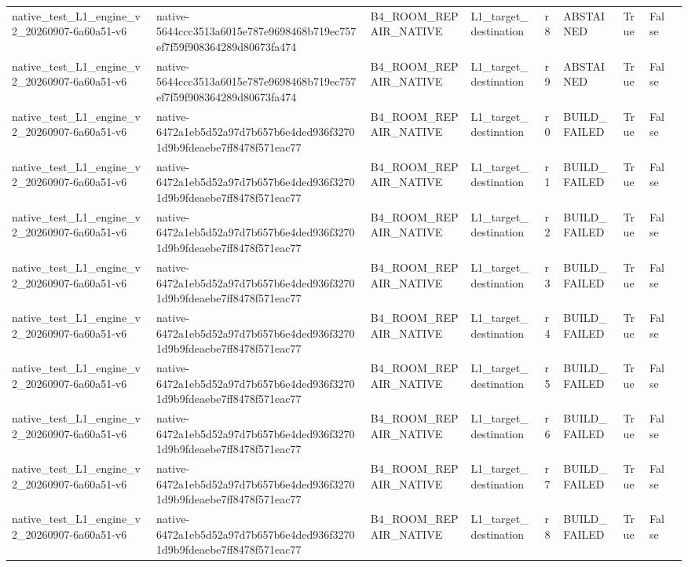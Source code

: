 \begin{tabular}{lllllllll}
native\_test\_L1\_engine\_v2\_20260907-6a60a51-v6 & native-5644ccc3513a6015e787e9698468b719ec757ef7f59f908364289d80673fa474 & B4\_ROOM\_REPAIR\_NATIVE & L1\_target\_destination & r8 & ABSTAINED & True & False &  \\
native\_test\_L1\_engine\_v2\_20260907-6a60a51-v6 & native-5644ccc3513a6015e787e9698468b719ec757ef7f59f908364289d80673fa474 & B4\_ROOM\_REPAIR\_NATIVE & L1\_target\_destination & r9 & ABSTAINED & True & False &  \\
native\_test\_L1\_engine\_v2\_20260907-6a60a51-v6 & native-6472a1eb5d52a97d7b657b6e4ded936f32701d9b9fdeaebe7ff8478f571eac77 & B4\_ROOM\_REPAIR\_NATIVE & L1\_target\_destination & r0 & BUILD\_FAILED & True & False &  \\
native\_test\_L1\_engine\_v2\_20260907-6a60a51-v6 & native-6472a1eb5d52a97d7b657b6e4ded936f32701d9b9fdeaebe7ff8478f571eac77 & B4\_ROOM\_REPAIR\_NATIVE & L1\_target\_destination & r1 & BUILD\_FAILED & True & False &  \\
native\_test\_L1\_engine\_v2\_20260907-6a60a51-v6 & native-6472a1eb5d52a97d7b657b6e4ded936f32701d9b9fdeaebe7ff8478f571eac77 & B4\_ROOM\_REPAIR\_NATIVE & L1\_target\_destination & r2 & BUILD\_FAILED & True & False &  \\
native\_test\_L1\_engine\_v2\_20260907-6a60a51-v6 & native-6472a1eb5d52a97d7b657b6e4ded936f32701d9b9fdeaebe7ff8478f571eac77 & B4\_ROOM\_REPAIR\_NATIVE & L1\_target\_destination & r3 & BUILD\_FAILED & True & False &  \\
native\_test\_L1\_engine\_v2\_20260907-6a60a51-v6 & native-6472a1eb5d52a97d7b657b6e4ded936f32701d9b9fdeaebe7ff8478f571eac77 & B4\_ROOM\_REPAIR\_NATIVE & L1\_target\_destination & r4 & BUILD\_FAILED & True & False &  \\
native\_test\_L1\_engine\_v2\_20260907-6a60a51-v6 & native-6472a1eb5d52a97d7b657b6e4ded936f32701d9b9fdeaebe7ff8478f571eac77 & B4\_ROOM\_REPAIR\_NATIVE & L1\_target\_destination & r5 & BUILD\_FAILED & True & False &  \\
native\_test\_L1\_engine\_v2\_20260907-6a60a51-v6 & native-6472a1eb5d52a97d7b657b6e4ded936f32701d9b9fdeaebe7ff8478f571eac77 & B4\_ROOM\_REPAIR\_NATIVE & L1\_target\_destination & r6 & BUILD\_FAILED & True & False &  \\
native\_test\_L1\_engine\_v2\_20260907-6a60a51-v6 & native-6472a1eb5d52a97d7b657b6e4ded936f32701d9b9fdeaebe7ff8478f571eac77 & B4\_ROOM\_REPAIR\_NATIVE & L1\_target\_destination & r7 & BUILD\_FAILED & True & False &  \\
native\_test\_L1\_engine\_v2\_20260907-6a60a51-v6 & native-6472a1eb5d52a97d7b657b6e4ded936f32701d9b9fdeaebe7ff8478f571eac77 & B4\_ROOM\_REPAIR\_NATIVE & L1\_target\_destination & r8 & BUILD\_FAILED & True & False &  \\

\end{tabular}
